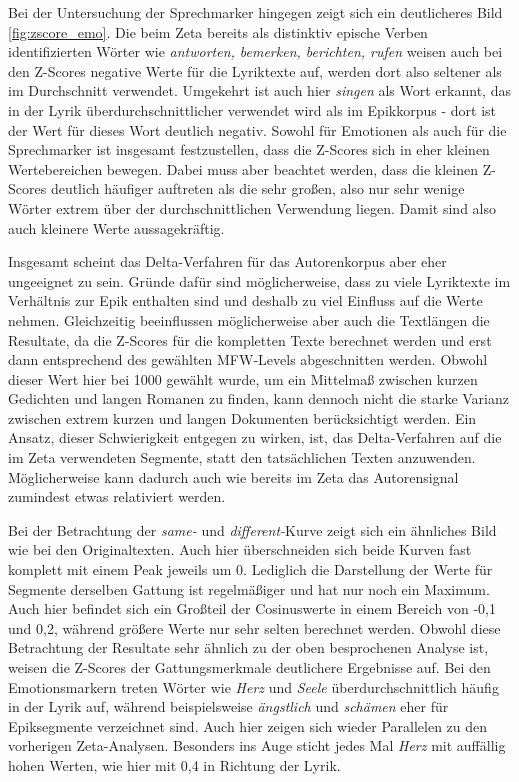 \documentclass[a4paper,10p]{article}
\begin{document}
Bei der Untersuchung der Sprechmarker hingegen zeigt sich ein deutlicheres Bild \ref{fig:zscore_emo}. Die beim Zeta bereits als distinktiv epische Verben identifizierten Wörter wie \textit{antworten, bemerken, berichten, rufen} weisen auch bei den Z-Scores negative Werte für die Lyriktexte auf, werden dort also seltener als im Durchschnitt verwendet. Umgekehrt ist auch hier \textit{singen} als Wort erkannt, das in der Lyrik überdurchschnittlicher verwendet wird als im Epikkorpus - dort ist der Wert für dieses Wort deutlich negativ. Sowohl für Emotionen als auch für die Sprechmarker ist insgesamt festzustellen, dass die Z-Scores sich in eher kleinen Wertebereichen bewegen. Dabei muss aber beachtet werden, dass die kleinen Z-Scores deutlich häufiger auftreten als die sehr großen, also nur sehr wenige Wörter extrem über der durchschnittlichen Verwendung liegen. Damit sind also auch kleinere Werte aussagekräftig. \par 

Insgesamt scheint das Delta-Verfahren für das Autorenkorpus aber eher ungeeignet zu sein. Gründe dafür sind möglicherweise, dass zu viele Lyriktexte im Verhältnis zur Epik enthalten sind und deshalb zu viel Einfluss auf die Werte nehmen. Gleichzeitig beeinflussen möglicherweise aber auch die Textlängen die Resultate, da die Z-Scores für die kompletten Texte berechnet werden und erst dann entsprechend des gewählten MFW-Levels abgeschnitten werden. Obwohl dieser Wert hier bei 1000 gewählt wurde, um ein Mittelmaß zwischen kurzen Gedichten und langen Romanen zu finden, kann dennoch nicht die starke Varianz zwischen extrem kurzen und langen Dokumenten berücksichtigt werden. Ein Ansatz, dieser Schwierigkeit entgegen zu wirken, ist, das Delta-Verfahren auf die im Zeta verwendeten Segmente, statt den tatsächlichen Texten anzuwenden. Möglicherweise kann dadurch auch wie bereits im Zeta das Autorensignal zumindest etwas relativiert werden. \par                 

Bei der Betrachtung der \textit{same-} und  \textit{different-}Kurve zeigt sich ein ähnliches Bild wie bei den Originaltexten. Auch hier überschneiden sich beide Kurven fast komplett mit einem Peak jeweils um 0. Lediglich die Darstellung der Werte für Segmente derselben Gattung ist regelmäßiger und hat nur noch ein Maximum. Auch hier befindet sich ein Großteil der Cosinuswerte in einem Bereich von -0,1 und 0,2, während größere Werte nur sehr selten berechnet werden. Obwohl diese Betrachtung der Resultate sehr ähnlich zu der oben besprochenen Analyse ist, weisen die Z-Scores der Gattungsmerkmale deutlichere Ergebnisse auf. Bei den Emotionsmarkern treten Wörter wie \textit{Herz} und \textit{Seele} überdurchschnittlich häufig in der Lyrik auf, während beispielsweise \textit{ängstlich} und \textit{schämen} eher für Epiksegmente verzeichnet sind. Auch hier zeigen sich wieder Parallelen zu den vorherigen Zeta-Analysen. Besonders ins Auge sticht jedes Mal \textit{Herz} mit auffällig hohen Werten, wie hier mit 0,4 in Richtung der Lyrik. \par 
\end{document}
